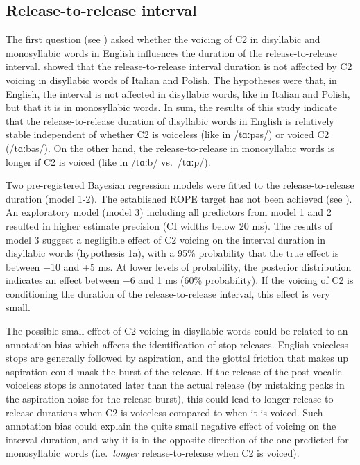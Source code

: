 \documentclass[
  12pt,
  a4paper,
]{article}
\begin{document}
\hypertarget{release-to-release-interval}{%
\subsection{Release-to-release
interval}\label{release-to-release-interval}}

\label{s:rr-disc}

The first question (see ) asked whether the voicing of C2
in disyllabic and monosyllabic words in English influences the duration
of the release-to-release interval. \citet{coretta2018j} showed that the
release-to-release interval duration is not affected by C2 voicing in
disyllabic words of Italian and Polish. The hypotheses were that, in
English, the interval is not affected in disyllabic words, like in
Italian and Polish, but that it is in monosyllabic words. In sum, the
results of this study indicate that the release-to-release duration of
disyllabic words in English is relatively stable independent of whether
C2 is voiceless (like in /tɑːpəs/) or voiced C2 (/tɑːbəs/). On the other
hand, the release-to-release in monosyllabic words is longer if C2 is
voiced (like in /tɑːb/ vs.~/tɑːp/).

Two pre-registered Bayesian regression models were fitted to the
release-to-release duration (model 1-2). The established ROPE target has
not been achieved (see ). An exploratory model
(model 3) including all predictors from model 1 and 2 resulted in higher
estimate precision (CI widths below 20 ms). The results of model 3
suggest a negligible effect of C2 voicing on the interval duration in
disyllabic words (hypothesis 1a), with a 95\% probability that the true
effect is between −10 and +5 ms. At lower levels of probability, the
posterior distribution indicates an effect between −6 and 1 ms (60\%
probability). If the voicing of C2 is conditioning the duration of the
release-to-release interval, this effect is very small.

The possible small effect of C2 voicing in disyllabic words could be
related to an annotation bias which affects the identification of stop
releases. English voiceless stops are generally followed by aspiration,
and the glottal friction that makes up aspiration could mask the burst
of the release. If the release of the post-vocalic voiceless stops is
annotated later than the actual release (by mistaking peaks in the
aspiration noise for the release burst), this could lead to longer
release-to-release durations when C2 is voiceless compared to when it is
voiced. Such annotation bias could explain the quite small negative
effect of voicing on the interval duration, and why it is in the
opposite direction of the one predicted for monosyllabic words
(i.e.~\emph{longer} release-to-release when C2 is voiced).
\end{document}
